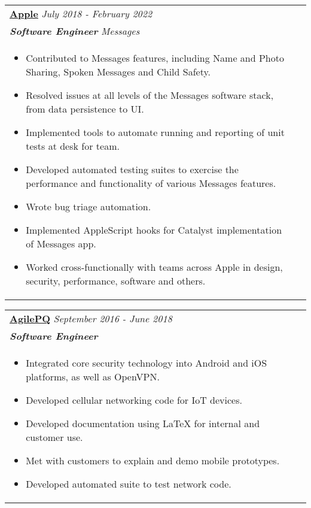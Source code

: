\documentclass[10pt]{article}
\begin{document}
\begin{tabularx}{\linewidth}{ @{}l r@{} }
\textbf{\uline{Apple}} \hfill \textit{July 2018 - February 2022}\\[4pt]
\textbf{\textit{Software Engineer}} \hfill \textit{Messages} \\[5pt]
\begin{minipage}[t]{\linewidth}
\begin{itemize}[leftmargin=2em, nosep, after=\strut, itemsep=2pt]
\item Contributed to Messages features, including Name and Photo Sharing, Spoken Messages and Child Safety.
\item Resolved issues at all levels of the Messages software stack, from data persistence to UI.
\item Implemented tools to automate running and reporting of unit tests at desk for team.
\item Developed automated testing suites to exercise the performance and functionality of various Messages features.
\item Wrote bug triage automation.
\item Implemented AppleScript hooks for Catalyst implementation of Messages app.
\item Worked cross-functionally with teams across Apple in design, security, performance, software and others.
\end{itemize}
\end{minipage}
\end{tabularx}

\begin{tabularx}{\linewidth}{ @{}l r@{} }
\textbf{\uline{AgilePQ}} \hfill \textit{September 2016 - June 2018}\\[4pt]
\textbf{\textit{Software Engineer}}\\[5pt]
\begin{minipage}[t]{\linewidth}
\begin{itemize}[leftmargin=2em, nosep, after=\strut, itemsep=2pt]
\item Integrated core security technology into Android and iOS platforms, as well as OpenVPN.
\item Developed cellular networking code for IoT devices.
\item Developed documentation using LaTeX for internal and customer use.
\item Met with customers to explain and demo mobile prototypes.
\item Developed automated suite to test network code.
\end{itemize}
\end{minipage}
\end{tabularx}
\end{document}
